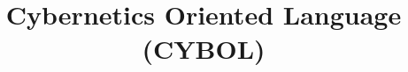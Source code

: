 %
%
%
%
%
%

%
%
%
%
\begin{titlepage}
    \title{
        Cybernetics Oriented Language\\
        (CYBOL)\\
        \vspace{1cm}
        \begin{normalsize}
            \textmd{\subtitlemacro\\}
        \end{normalsize}
    }
    \author{
        \date{
        }
    }
\end{titlepage}
